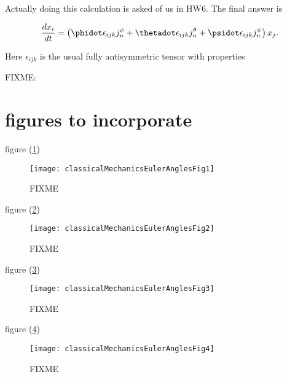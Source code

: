 Actually doing this calculation is asked of us in HW6.  The final answer is

\begin{equation}\label{eqn:classicalMechanicsEulerAngles:n}
\frac{d x_i}{dt} = \left(
\phidot \epsilon_{ijk} j_n^\phi
+\thetadot \epsilon_{ijk} j_n^\theta
+\psidot \epsilon_{ijk} j_n^\psi
\right) x_j.
\end{equation}

Here $\epsilon_{ijk}$ is the usual fully antisymmetric tensor with properties

FIXME:

\section{figures to incorporate}
figure (\ref{fig:classicalMechanicsEulerAngles:classicalMechanicsEulerAnglesFig1})
\begin{figure}[htp]
   \centering
   \texttt{[image: classicalMechanicsEulerAnglesFig1]}
   \caption{FIXME}\label{fig:classicalMechanicsEulerAngles:classicalMechanicsEulerAnglesFig1}
\end{figure}
figure (\ref{fig:classicalMechanicsEulerAngles:classicalMechanicsEulerAnglesFig2})
\begin{figure}[htp]
   \centering
   \texttt{[image: classicalMechanicsEulerAnglesFig2]}
   \caption{FIXME}\label{fig:classicalMechanicsEulerAngles:classicalMechanicsEulerAnglesFig2}
\end{figure}
figure (\ref{fig:classicalMechanicsEulerAngles:classicalMechanicsEulerAnglesFig3})
\begin{figure}[htp]
   \centering
   \texttt{[image: classicalMechanicsEulerAnglesFig3]}
   \caption{FIXME}\label{fig:classicalMechanicsEulerAngles:classicalMechanicsEulerAnglesFig3}
\end{figure}
figure (\ref{fig:classicalMechanicsEulerAngles:classicalMechanicsEulerAnglesFig4})
\begin{figure}[htp]
   \centering
   \texttt{[image: classicalMechanicsEulerAnglesFig4]}
   \caption{FIXME}\label{fig:classicalMechanicsEulerAngles:classicalMechanicsEulerAnglesFig4}
\end{figure}
